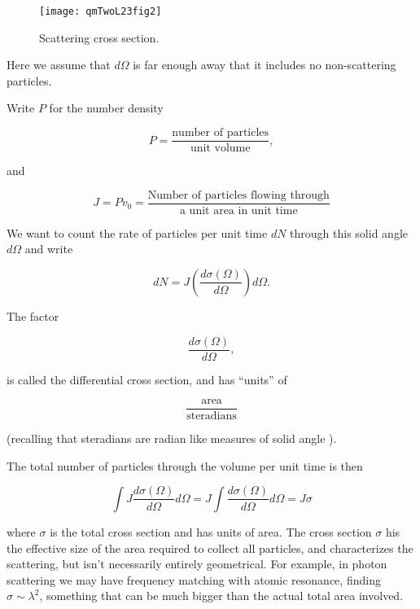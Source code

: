\begin{figure}[htp]
   \centering
   \texttt{[image: qmTwoL23fig2]}
   \caption{Scattering cross section.}\label{fig:qmTwoL23:qmTwoL23fig2}
\end{figure}

Here we assume that $d\Omega$ is far enough away that it includes no non-scattering particles.

Write $P$ for the number density

\begin{equation}\label{eqn:qmTwoL23:680}
P = \frac{\text{number of particles}}{\text{unit volume}},
\end{equation}

and

\begin{equation}\label{eqn:qmTwoL23:700}
J = P v_0 =
\frac{
\text{Number of particles flowing through}
}{
\text{a unit area in unit time}
}
\end{equation}

We want to count the rate of particles per unit time $dN$ through this solid angle $d\Omega$ and write

\begin{equation}\label{eqn:qmTwoL23:720}
dN = J \left( \frac{d \sigma(\Omega)}{d\Omega} \right) d\Omega.
\end{equation}

The factor

\begin{equation}\label{eqn:qmTwoL23:740}
\frac{d \sigma(\Omega)}{d\Omega},
\end{equation}

is called the differential cross section, and has ``units'' of

\begin{equation}\label{eqn:qmTwoL23:760}
\frac{\text{area}}{\text{steradians}}
\end{equation}

(recalling that steradians are radian like measures of solid angle \cite{wiki:steradian}).

The total number of particles through the volume per unit time is then

\begin{equation}\label{eqn:qmTwoL23:780}
\int J \frac{d \sigma(\Omega)}{d\Omega} d\Omega
= J \int \frac{d \sigma(\Omega)}{d\Omega} d\Omega
= J \sigma
\end{equation}

where $\sigma$ is the total cross section and has units of area.  The cross section $\sigma$ his the effective size of the area required to collect all particles, and characterizes the scattering, but isn't necessarily entirely geometrical.  For example, in photon scattering we may have frequency matching with atomic resonance, finding $\sigma \sim \lambda^2$, something that can be much bigger than the actual total area involved.


